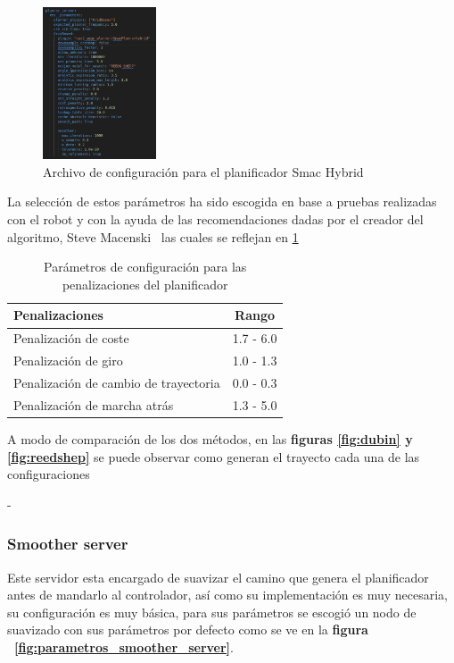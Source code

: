 \begin{figure}[H]
    \centering
    \includegraphics[width=0.3\textwidth]{images/configuracion_planner.png}
    \caption{Archivo de configuración para el planificador Smac Hybrid}
    \label{fig:configuracion_planner}
\end{figure}

La selección de estos parámetros ha sido escogida en base a pruebas realizadas con el robot y con la ayuda de las recomendaciones dadas 
por el creador del algoritmo, Steve Macenski~\cite{steve_mc} las cuales se reflejan en \ref{tab:parametros_planificador_steve}

\begin{table}[h!]
    \centering
    \caption{Parámetros de configuración para las penalizaciones del planificador}
    \begin{tabular}{|l|c|}
        \hline
        Penalizaciones     & Rango      \\ \hline
        Penalización de coste          & 1.7 - 6.0  \\ \hline
        Penalización de giro  & 1.0 - 1.3  \\ \hline
        Penalización de cambio de trayectoria        & 0.0 - 0.3  \\ \hline
        Penalización de marcha atrás       & 1.3 - 5.0  \\ \hline
    \end{tabular}
    \label{tab:parametros_planificador_steve}
\end{table}

A modo de comparación de los dos métodos, en las \textbf{figuras \ref{fig:dubin} y \ref{fig:reedshep}} se puede observar como generan el trayecto cada una de las configuraciones

-


\subsubsection{Smoother server}
Este servidor esta encargado de suavizar el camino que genera el planificador antes de mandarlo al controlador, así como su implementación es muy necesaria,  
su configuración es muy básica, para sus parámetros se escogió un nodo de suavizado con sus parámetros por defecto como se ve en la \textbf{figura ~\ref{fig:parametros_smoother_server}}.

